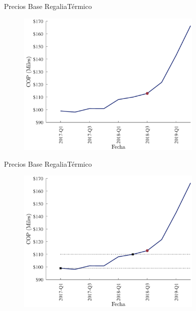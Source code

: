 \documentclass[usenames,dvipsnames]{beamer}
\begin{document}
\begin{frame}{Precios Base Regalia}{Térmico}
    \begin{figure}
        \centering
        \includegraphics[width=0.8\textwidth]{Figures/oldCalc1.pdf}
    \end{figure}
\end{frame}

\begin{frame}{Precios Base Regalia}{Térmico}
    \begin{figure}
        \centering
        \includegraphics[width=0.8\textwidth]{Figures/oldCalc2.pdf}
    \end{figure}
\end{frame}
\end{document}
